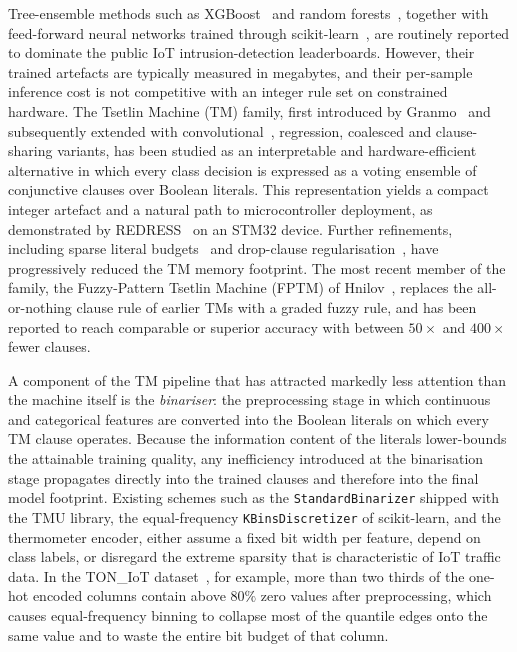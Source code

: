 \documentclass[journal,10pt]{IEEEtran}
\begin{document}
Tree-ensemble methods such as XGBoost~\cite{chen2016xgboost} and random
forests~\cite{breiman2001random}, together with feed-forward neural
networks trained through scikit-learn~\cite{pedregosa2011scikit}, are
routinely reported to dominate the public IoT intrusion-detection
leaderboards. However, their trained artefacts are typically measured
in megabytes, and their per-sample inference cost is not competitive
with an integer rule set on constrained hardware. The Tsetlin Machine
(TM) family, first introduced by Granmo~\cite{granmo2018tsetlin} and
subsequently extended with convolutional~\cite{granmo2019convolutional},
regression, coalesced and clause-sharing variants, has been studied as
an interpretable and hardware-efficient alternative in which every
class decision is expressed as a voting ensemble of conjunctive clauses
over Boolean literals. This representation yields a compact integer
artefact and a natural path to microcontroller deployment, as
demonstrated by REDRESS~\cite{maheshwari2023redress} on an STM32 device.
Further refinements, including sparse literal
budgets~\cite{bhattarai2023concise} and drop-clause
regularisation~\cite{sharma2023drop}, have progressively reduced the
TM memory footprint. The most recent member of the family, the
Fuzzy-Pattern Tsetlin Machine (FPTM) of Hnilov~\cite{hnilov2025fuzzy},
replaces the all-or-nothing clause rule of earlier TMs with a graded
fuzzy rule, and has been reported to reach comparable or superior
accuracy with between $50\times$ and $400\times$ fewer clauses.

A component of the TM pipeline that has attracted markedly less
attention than the machine itself is the \emph{binariser}: the
preprocessing stage in which continuous and categorical features are
converted into the Boolean literals on which every TM clause operates.
Because the information content of the literals lower-bounds the
attainable training quality, any inefficiency introduced at the
binarisation stage propagates directly into the trained clauses and
therefore into the final model footprint. Existing schemes such as the
\texttt{StandardBinarizer} shipped with the TMU library, the
equal-frequency \texttt{KBinsDiscretizer} of scikit-learn, and the
thermometer encoder, either assume a fixed bit width per feature,
depend on class labels, or disregard the extreme sparsity that is
characteristic of IoT traffic data. In the TON\_IoT
dataset~\cite{moustafa2021ton}, for example, more than two thirds of
the one-hot encoded columns contain above $80\%$ zero values after
preprocessing, which causes equal-frequency binning to collapse most
of the quantile edges onto the same value and to waste the entire bit
budget of that column.
\end{document}
